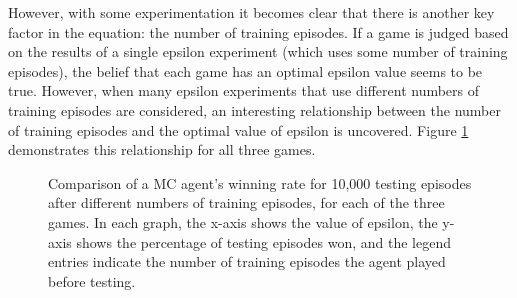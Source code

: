 \documentclass[11pt,a4paper]{report}
\begin{document}
However, with some experimentation it becomes clear that there is another key factor in the equation: the number of training episodes. If a game is judged based on the results of a single epsilon experiment (which uses some number of training episodes), the belief that each game has an optimal epsilon value seems to be true. However, when many epsilon experiments that use different numbers of training episodes are considered, an interesting relationship between the number of training episodes and the optimal value of epsilon is uncovered. Figure \ref{epsilon-win-comparisons} demonstrates this relationship for all three games.

\begin{figure}[htbp]
    \centering
    \caption{Comparison of a MC agent's winning rate for 10,000 testing episodes after different numbers of training episodes, for each of the three games. In each graph, the x-axis shows the value of epsilon, the y-axis shows the percentage of testing episodes won, and the legend entries indicate the number of training episodes the agent played before testing.}
    \label{epsilon-win-comparisons}
\end{figure}
\end{document}
